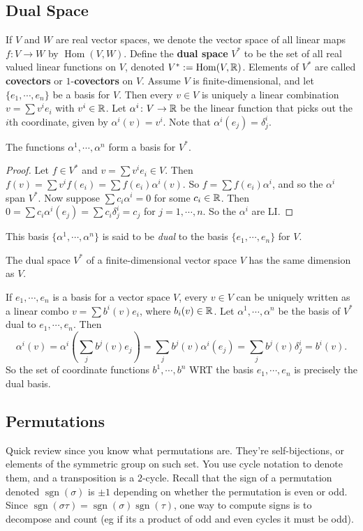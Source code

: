 \subsection{Dual Space}
If $V$ and $W$ are real vector spaces, we denote the vector space of all linear maps $f \colon V \to W$ by $\operatorname{Hom}(V,W)$. Define the \textbf{dual space} $V^*$ to be the set of all real valued linear functions on $V$, denoted  $V^*:= \operatorname{Hom}(V,\mathbb{R})$. Elements of $V^*$ are called \textbf{covectors} or $1$-\textbf{covectors} on $V$. Assume $V$ is finite-dimensional, and let $\{e_1,\cdots ,e_n \} $ be a basis for $V$. Then every $v\in V$ is uniquely a linear combination $v=\sum v^i e_i $ with $v^i \in \mathbb{R}$. Let $\alpha ^i \colon V \to \mathbb{R}$ be the linear function that picks out the $i$th coordinate, given by  $\alpha ^i (v)=v^i $. Note that $\alpha ^i (e_j )=\delta_j ^i $.
\begin{prop}
    The functions $\alpha ^1,\cdots ,\alpha ^n $ form a basis for $V^*$.
\end{prop}
\begin{proof}
    Let $f\in V^*$ and $v=\sum v^i e_i \in V$. Then $f(v)=\sum v^i f(e_i )=\sum f(e_i )\alpha ^i (v)$. So $f=\sum f(e_i )\alpha ^i $, and so the $\alpha ^i $ span $V^*$. Now suppose $\sum c_i \alpha ^i =0$ for some $c_i \in \mathbb{R}$. Then $0=\sum c_i \alpha ^i (e_j )=\sum c_i \delta_j ^i =c_j $ for $j=1,\cdots ,n$. So the $\alpha ^i $ are LI.
\end{proof}
This basis $\{\alpha ^1,\cdots ,\alpha ^n \} $ is said to be \emph{dual} to the basis $\{e_1,\cdots ,e_n \} $ for $V$.
\begin{cor}
    The dual space $V^*$ of a finite-dimensional vector space $V$ has the same dimension as $V$.
\end{cor}
\begin{example}
    If $e_1,\cdots ,e_n $ is a basis for a vector space $V$, every $v\in V$ can be uniquely written as a linear combo $v=\sum b^i (v)e_i $, where $b_i (v)\in \mathbb{R}$. Let $\alpha^1,\cdots ,\alpha ^n $ be the basis of $V^*$ dual to $e_1,\cdots ,e_n $. Then \[
        \alpha ^i (v)= \alpha ^i  \left( \sum_j b^j(v)e_j  \right) =\sum_j b^j (v)\alpha ^i (e_j )=\sum_j b^j(v)\delta_j ^i =b^i (v).
    \] So the set of coordinate functions $b^1,\cdots ,b^n $ WRT the basis $e_1,\cdots ,e_n $ is precisely the dual basis.
\end{example}
\subsection{Permutations}
Quick review since you know what permutations are. They're self-bijections, or elements of the symmetric group on such set. You use cycle notation to denote them, and a transposition is a $2$-cycle. Recall that the sign of a permutation denoted $\operatorname{sgn}(\sigma)$ is $\pm 1$ depending on whether the permutation is even or odd. Since $\operatorname{sgn}(\sigma\tau)=\operatorname{sgn}(\sigma)\operatorname{sgn}(\tau)$, one way to compute signs is to decompose and count (eg if its a product of odd and even cycles it must be odd).

